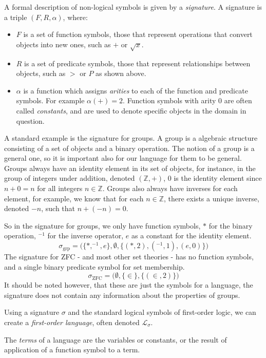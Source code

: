 \documentclass[12pt]{article}
\theoremstyle{definition}
\begin{document}
A formal description of non-logical symbols is
given by a \emph{signature}. A signature is a triple $(F,R,\alpha)$, where:
\begin{itemize}
\item $F$ is a set of function symbols, those that represent operations that convert objects into new ones, such as $+$ or $\sqrt{x}$.
\item $R$ is a set of predicate symbols, those that represent relationships between objects, such as $>$ or $P$ as shown above.
\item $\alpha$ is a function which assigns \emph{arities} to each of the function and predicate symbols.
For example $\alpha(+) = 2$. Function symbols with arity $0$ are often called \emph{constants}, and are used to denote specific objects in the domain in question.
\end{itemize}
A standard example is the signature for groups.
A group is a algebraic structure consisting of a set of objects and a binary operation.
The notion of a group is a general one, so it is important also for our language for them to be general.
Groups always have an identity element in its set of objects, for instance, in the group of integers under addition, denoted $(\mathbb{Z}, +)$, $0$ is the identity element since $n + 0 = n$ for all integers $n\in\mathbb{Z}$.
Groups also always have inverses for each element, for example, we know that for each $n\in\mathbb{Z}$, there exists a unique inverse, denoted $-n$, such that $n + (-n) = 0$.

So in the signature for groups, we only have function symbols, $*$ for the binary operation, $^{-1}$ for the inverse operator, $e$ as a constant for the identity element.
$$\sigma_{\text{grp}} = \big(\{*,^{-1}, e\},\emptyset,\{(*, 2), (^{-1}, 1),(e,0)\}\big)$$
The signature for ZFC - and most other set theories - has no function symbols, and a single binary predicate symbol for set membership.
$$\sigma_{\text{ZFC}} = \big(\emptyset,\{\in\},\{(\in, 2)\})$$
It should be noted however, that these are just the symbols for a language, the signature does not contain any information about the properties of groups.

Using a signature $\sigma$ and the standard logical symbols of first-order logic, we can create a \emph{first-order language}, often denoted $\mathcal{L}_\sigma$.

The \emph{terms} of a language are the variables or constants, or the result of application of a function symbol to a term.
\end{document}
